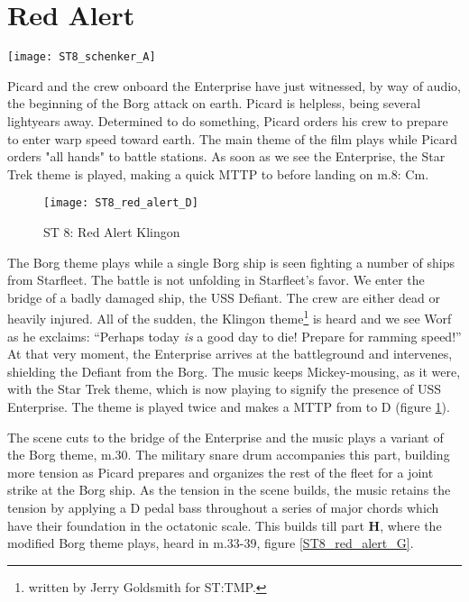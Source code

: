 \section{Red Alert}
\begin{figure*}[h!]
\center
\texttt{[image: ST8\_schenker\_A]}
	\caption{ST 8: Red Alert A: Prolonged Aeolian Cadence.}
	\label{ST8_schenker_A}
\end{figure*}

\noindent Picard and the crew onboard the Enterprise have just witnessed, by way of audio, the beginning of the Borg attack on earth. Picard is helpless, being several lightyears away. Determined to do something, Picard orders his crew to prepare to enter warp speed toward earth. The main theme of the film plays while Picard orders "all hands" to battle stations. As soon as we see the Enterprise, the Star Trek theme is played, making a quick \ac{MTTP} to \ciss before landing on m.8: Cm.

\begin{figure}[h!]
\center
\texttt{[image: ST8\_red\_alert\_D]}
	\caption{ST 8: Red Alert Klingon}
	\label{ST8_red_alert_D}
\end{figure}

The Borg theme plays while a single Borg ship is seen fighting a number of ships from Starfleet. The battle is not unfolding in Starfleet's favor. We enter the bridge of a badly damaged ship, the USS Defiant. The crew are either dead or heavily injured. All of the sudden, the Klingon theme\footnote{written by Jerry Goldsmith for \ac{ST:TMP}.} is heard and we see Worf as he exclaims: ``Perhaps today \textit{is} a good day to die! Prepare for ramming speed!'' At that very moment, the Enterprise arrives at the battleground and intervenes, shielding the Defiant from the Borg. The music keeps Mickey-mousing, as it were, with the Star Trek theme, which is now playing to signify the presence of USS Enterprise. The theme is played twice and makes a \acf{MTTP} from \aflat to D (figure \ref{ST8_red_alert_D}).

The scene cuts to the bridge of the Enterprise and the music plays a variant of the Borg theme, m.30. The military snare drum accompanies this part, building more tension as Picard prepares and organizes the rest of the fleet for a joint strike at the Borg ship.
As the tension in the scene builds, the music retains the tension by applying a D pedal bass throughout a series of major chords which have their foundation in the octatonic scale. This builds till part \textbf{H}, where the modified Borg theme plays, heard in m.33-39, figure \ref{ST8_red_alert_G}.

